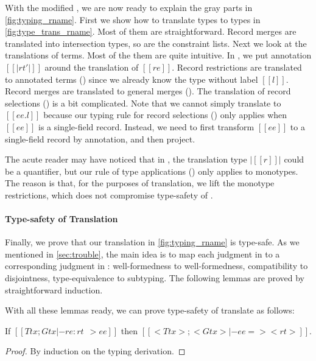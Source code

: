 With the modified \rname, we are now ready to explain the gray parts in \cref{fig:typing_rname}. First we
show how to translate \rname types to \fnamee types in
\cref{fig:type_trans_rname}. Most of them are straightforward. Record merges are
translated into intersection types, so are the constraint lists. Next we look at the
translations of terms. Most of the them are quite intuitive. In ,
we put annotation $[[ | rt' | ]]$ around the translation of $[[re]]$. Record
restrictions are translated to annotated terms () since we
already know the type without label $[[l]]$. Record merges are translated to
general merges (). The translation of record selections () is  a bit
complicated. Note that we cannot simply translate to $[[ ee . l ]]$ because our
typing rule for record selections () only applies when $[[ee]]$ is a
single-field record. Instead, we need to first transform $[[ee]]$ to a
single-field record by annotation, and then project.

\begin{remark}
  The acute reader may have noticed that in , the translation type
  $| [[r]] |$ could be a quantifier, but our rule of type applications
  () only applies to monotypes. The reason is that, for the
  purposes of translation, we lift the monotype restrictions, which does not
  compromise type-safety of \fnamee.
\end{remark}


\paragraph{Type-safety of Translation}

Finally, we prove that our translation in \cref{fig:typing_rname} is type-safe.
As we mentioned in \cref{sec:trouble}, the main idea is to map each judgment in
\rname to a corresponding judgment in \fnamee: well-formedness to
well-formedness, compatibility to disjointness, type-equivalence to subtyping.
The following lemmas are proved by straightforward induction.


With all these lemmas ready, we can prove type-safety of translate as follows:

\begin{theorem}
  If $[[ Ttx ; Gtx |- re : rt ~~> ee ]]$ then $[[ < Ttx > ; < Gtx > |-  ee => < rt >  ]]$.
\end{theorem}
\begin{proof}
  By induction on the typing derivation.
\end{proof}




